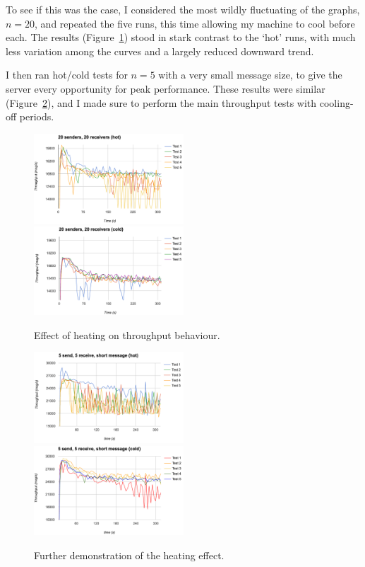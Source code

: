 \documentclass[12pt,a4paper,twoside,openright]{report}
\begin{document}
{To see if this was the case, I considered the most wildly fluctuating of the graphs, $n=20$, and repeated the five runs, this time allowing my machine to cool before each. The results (Figure~\ref{fig:20hotcold}) stood in stark contrast to the `hot' runs, with much less variation among the curves and a largely reduced downward trend.

I then ran hot/cold tests for $n=5$ with a very small message size, to give the server every opportunity for peak performance. These results were similar (Figure~\ref{fig:5hotcold}), and I made sure to perform the main throughput tests with cooling-off periods.

\begin{figure}
  \includegraphics[width=0.5\textwidth]{../transcripts/lipsum/20n20/hot/hot.png}
  \includegraphics[width=0.5\textwidth]{../transcripts/lipsum/20n20/cold/cold.png}
  \caption{Effect of heating on throughput behaviour.}
  \label{fig:20hotcold}
\end{figure}

\begin{figure}
  \includegraphics[width=0.5\textwidth]{../transcripts/hi/5n5/hot/hot.png}
  \includegraphics[width=0.5\textwidth]{../transcripts/hi/5n5/cold/cold.png}
  \caption{Further demonstration of the heating effect.}
  \label{fig:5hotcold}
\end{figure}

}
\end{document}
